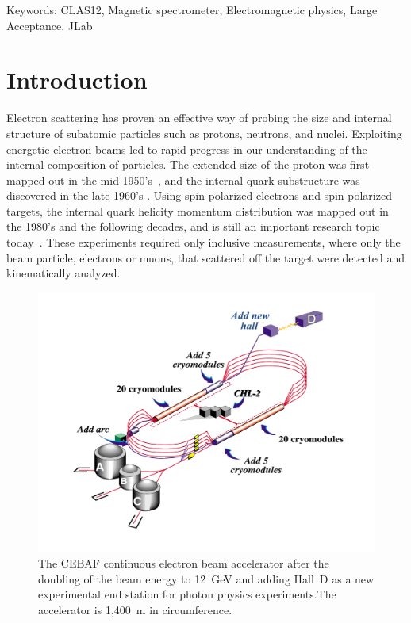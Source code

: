 \documentclass[final,3p]{elsarticle}
\begin{document}
\begin{twocolumn}
\noindent
Keywords: CLAS12, Magnetic spectrometer, Electromagnetic physics, Large Acceptance, JLab

\section{Introduction}

Electron scattering has proven an effective way of probing the size and internal structure of subatomic
particles such as protons, neutrons, and nuclei. Exploiting energetic electron beams led to rapid progress in our
understanding of the internal composition of particles. The extended size of the proton was first mapped out in
the mid-1950's~\cite{Mcallister:1956ng}, and the internal quark substructure was discovered in the late 1960's
\cite{Breidenbach:1969kd}. Using spin-polarized electrons and spin-polarized targets, the internal quark helicity
momentum distribution was mapped out in the 1980's and the following decades, and is still an important research
topic today~\cite{Kuhn:2008sy}. These experiments required only inclusive measurements, where only the beam
particle, electrons or muons, that scattered off the target were detected and kinematically analyzed.  

\begin{figure}[ht]
\centerline{\includegraphics[width=1.0\columnwidth]{cebaf.pdf}}
\caption{The CEBAF continuous electron beam accelerator after the doubling of the beam energy to 12~GeV and 
adding Hall~D as a new experimental end station for photon physics experiments.The accelerator is 1,400~m in
circumference.}
\label{cebaf12}
\end{figure} 


\end{twocolumn}
\end{document}
